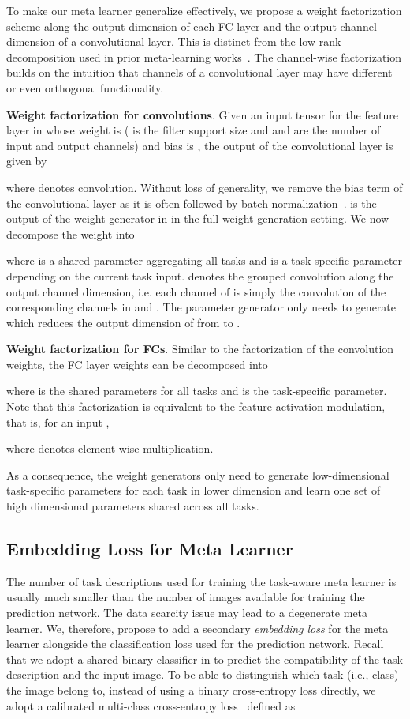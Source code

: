 \documentclass[10pt,twocolumn,letterpaper]{article}
\newcommand\minisection[1]{\vspace{2mm}\noindent \textbf{#1}}
\begin{document}
To make our meta learner generalize effectively, we propose a weight 
factorization scheme along the output dimension of each FC layer and 
the output channel dimension of a convolutional layer.
This is distinct from the low-rank decomposition used in prior meta-learning works~\cite{bertinetto2016learning}. 
The channel-wise factorization builds on the intuition 
that channels of a convolutional layer
may have different or even orthogonal functionality. 


\minisection{Weight factorization for convolutions}. 
Given an input tensor  for
the  feature layer in  whose weight is  
( is the filter support size and  and  are 
the number of input and output channels) and bias is  , the output  of the convolutional layer is given
by 

where  denotes convolution. Without loss of generality, we remove the bias term of the convolutional layer as it is often followed by batch normalization~\cite{ioffe2015batch}.  is
the output of the  weight generator in  in the full weight generation setting.  
We now decompose the weight  into 

where  is a shared parameter aggregating all tasks  and 
is a task-specific parameter depending on the current task input.  denotes the grouped convolution along the output channel dimension,
i.e. each channel of  is simply the convolution of the corresponding channels in  and . 
The parameter generator  only needs to generate 
 which reduces the output dimension of  from  to .

\minisection{Weight factorization for FCs}. 
Similar to the factorization of the convolution weights,
the FC layer weights  can be decomposed into 

where  is the shared parameters for
all tasks and  is the task-specific parameter. Note that this factorization 
is equivalent to the feature activation modulation, that is, for an input , 

where  denotes element-wise multiplication. 

As a consequence,  the weight generators only need to generate low-dimensional
task-specific parameters for each task in lower dimension and learn one set of high 
dimensional parameters shared across all tasks. 

\subsection{Embedding Loss for Meta Learner}
\label{sec:embed_loss}
The number of task descriptions used for training the
task-aware meta learner is usually much smaller than the number of images available
for training the prediction network. The data scarcity issue may lead to a 
degenerate meta learner. We, therefore, propose to add a secondary \textit{embedding
	loss}  for the meta learner alongside the classification loss  used for the prediction network. Recall that we adopt a shared binary classifier in  to predict the
compatibility of the task description and the input image. To be able to distinguish which task (i.e., class) 
the image belong to, instead of using a binary cross-entropy loss directly, we adopt a calibrated multi-class
cross-entropy loss~\cite{yang2018learning} defined as 
\end{document}
